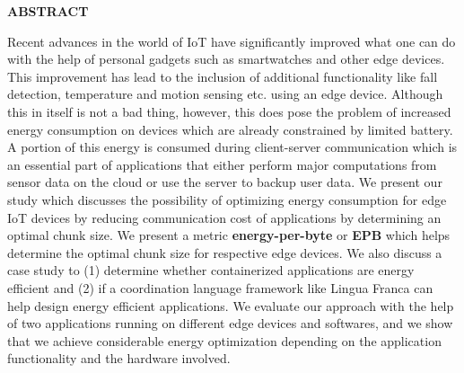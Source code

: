 {}
\begin{center}
    \textbf{ABSTRACT} 
\end{center}

Recent advances in the world of IoT have significantly improved what one 
can do with the help of personal gadgets such as smartwatches and other 
edge devices. This improvement has lead to the inclusion of additional 
functionality like fall detection, temperature and motion sensing etc. using an edge device. 
Although this in itself is not a bad thing, however, this does pose the 
problem of increased energy consumption on devices which are already 
constrained by limited battery. A portion of this energy is consumed during client-server communication 
which is an essential part of applications that either perform major computations from sensor data on the cloud 
or use the server to backup user data. 
We present our study which discusses the 
possibility of optimizing energy consumption for edge IoT devices by reducing 
communication cost of applications by determining an optimal chunk size. We 
present a metric \textbf{energy-per-byte} or \textbf{EPB} which helps determine 
the optimal chunk size for respective edge devices. We also discuss a case study to (1) determine 
whether containerized applications are energy efficient and (2) if a coordination language 
framework like Lingua Franca can help design energy efficient applications.
We evaluate our approach 
with the help of two applications running on different edge devices and softwares, 
and we show that we achieve considerable energy optimization depending on the application functionality 
and the hardware involved.